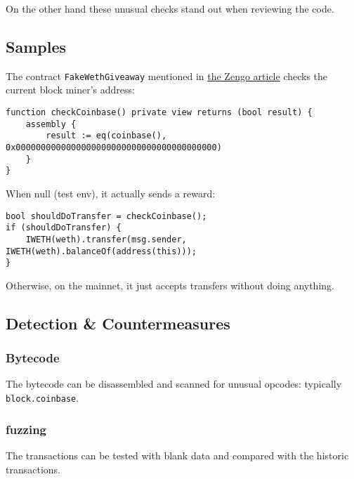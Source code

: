 On the other hand these unusual checks stand out when reviewing the code.

\subsection{Samples}

The contract \lstinline{FakeWethGiveaway} mentioned in \href{\urlarticleredpill}{the Zengo article} checks the current block miner’s address:

\begin{lstlisting}[language=Solidity]
function checkCoinbase() private view returns (bool result) {
    assembly {
        result := eq(coinbase(), 0x0000000000000000000000000000000000000000)
    }
}
\end{lstlisting}

When null (test env), it actually sends a reward:

\begin{lstlisting}[language=Solidity]
bool shouldDoTransfer = checkCoinbase();
if (shouldDoTransfer) {
    IWETH(weth).transfer(msg.sender, IWETH(weth).balanceOf(address(this)));
}
\end{lstlisting}

Otherwise, on the mainnet, it just accepts transfers without doing anything.

\subsection{Detection \& Countermeasures}

\subsubsection{Bytecode}

The bytecode can be disassembled and scanned for unusual opcodes: typically \lstinline[language=Solidity]{block.coinbase}.

\subsubsection{fuzzing}

The transactions can be tested with blank data and compared with the historic transactions.
